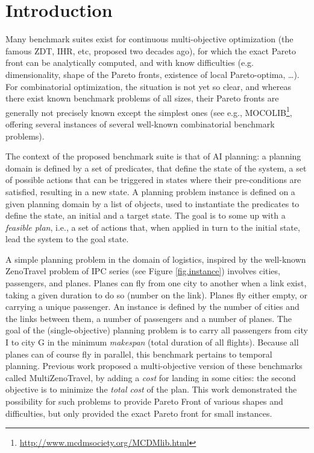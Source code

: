 \documentclass{llncs}
\def\ZENO{{\sc ZenoTravel}}
\def\MULTIZENO{{\sc MultiZenoTravel}}
\begin{document}
\section{Introduction}
\label{sec:intro}

Many benchmark suites exist for continuous multi-objective optimization (the famous ZDT, IHR, etc, proposed two decades ago), for which the exact Pareto front can be analytically computed, and with know difficulties (e.g. dimensionality, shape of the Pareto fronts, existence of local Pareto-optima, \ldots). For combinatorial optimization, the situation is not yet so clear, and whereas there exist known benchmark problems of all sizes, their Pareto fronts are generally not precisely known except the simplest ones (see e.g., MOCOLIB\footnote{\url{http://www.mcdmsociety.org/MCDMlib.html}}, offering several instances of several well-known combinatorial benchmark problems).

The context of the proposed benchmark suite is that of AI planning: a planning domain is defined by a set of predicates, that define the state of the system, a set of possible actions that can be triggered in states where their pre-conditions are satisfied, resulting in a new state. A planning problem instance is defined on a given planning domain by a list of objects, used to instantiate the predicates to define the state, an initial and a target state. The goal is to some up with a {\em feasible plan}, i.e., a set of actions that, when applied in turn to the initial state, lead the system to the goal state.

A simple planning problem in the domain of logistics, inspired by the well-known {\ZENO} problem of IPC series (see Figure \ref{fig.instance}) involves cities, passengers, and planes. Planes can fly from one city to another when a link exist, taking a given duration to do so (number on the link). Planes fly either empty, or carrying a unique passenger. An instance is defined by the number of cities and the links between them, a number of passengers and a number of planes. The goal of the (single-objective) planning problem is to carry all passengers from city I to city G in the minimum {\em makespan} (total duration of all flights). Because all planes can of course fly in parallel, this benchmark pertains to temporal planning. Previous work \cite{khouadjia:hal-00750560} proposed a multi-objective version of these benchmarks called \MULTIZENO, by adding a {\em cost} for landing in some cities: the second objective is to minimize the {\em total cost} of the plan. This work demonstrated the possibility for such 
problems to provide Pareto Front of various shapes and difficulties, but only provided the exact Pareto front for small instances.
\end{document}
